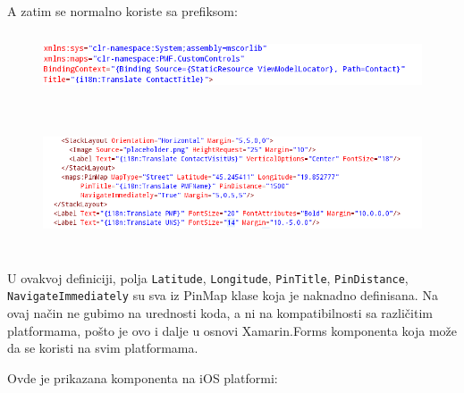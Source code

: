 \documentclass[a4paper]{article}
\begin{document}
A zatim se normalno koriste sa prefiksom:

\begin{figure}
\centering
\includegraphics[width=170mm,height=18.77mm]{msc-img58.png}
\end{figure}


\begin{figure}
\centering
\includegraphics[width=170mm,height=41.52mm]{msc-img59.png}
\end{figure}
U ovakvoj definiciji, polja
\texttt{\textcolor[rgb]{0.0,0.4,0.8}{Latitude}},
\texttt{\textcolor[rgb]{0.0,0.4,0.8}{Longitude}},
\texttt{\textcolor[rgb]{0.0,0.4,0.8}{PinTitle}},
\texttt{\textcolor[rgb]{0.0,0.4,0.8}{PinDistance}},
\texttt{\textcolor[rgb]{0.0,0.4,0.8}{NavigateImmediately}} su sva iz
PinMap klase koja je naknadno definisana. Na ovaj način ne gubimo na
urednosti koda, a ni na kompatibilnosti sa različitim platformama,
pošto je ovo i dalje u osnovi Xamarin.Forms komponenta koja može da se
koristi na svim platformama. 

Ovde je prikazana komponenta na iOS platformi:
\end{document}
